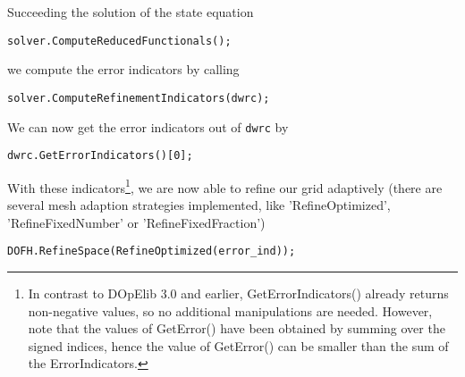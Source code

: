Succeeding the solution of the state equation 
\begin{verbatim}
solver.ComputeReducedFunctionals(); 
\end{verbatim}
we compute the error indicators by calling 
\begin{verbatim}
solver.ComputeRefinementIndicators(dwrc);
\end{verbatim}
We can now get the error indicators out of \texttt{dwrc} by 
\begin{verbatim}
dwrc.GetErrorIndicators()[0];
\end{verbatim}
With these indicators\footnote{In contrast to DOpElib 3.0 and earlier, GetErrorIndicators()
  already returns non-negative values, so no additional manipulations
  are needed. However, note that the values of GetError() have been
  obtained by summing over the signed indices, hence the value of
  GetError() can be smaller than the sum of the ErrorIndicators.
}, we are now able to refine our grid adaptively (there are several mesh adaption strategies implemented, like 'RefineOptimized', 'RefineFixedNumber' or 'RefineFixedFraction')
\begin{verbatim}
DOFH.RefineSpace(RefineOptimized(error_ind));
\end{verbatim}

